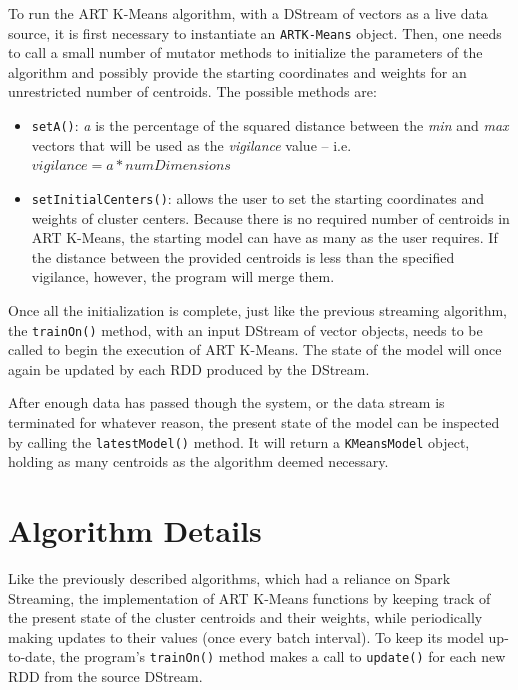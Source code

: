 \documentclass{l4proj}
\begin{document}
To run the ART K-Means algorithm, with a DStream of vectors as a live data source, it is first necessary to instantiate an \texttt{ARTK-Means} object. Then, one needs to call a small number of mutator methods to initialize the parameters of the algorithm and possibly provide the starting coordinates and weights for an unrestricted number of centroids. The possible methods are:

\begin{itemize}
\item \texttt{setA()}: \textit{a} is the percentage of the squared distance between the \textit{min} and \textit{max} vectors that will be used as the \textit{vigilance} value -- i.e. $vigilance = a * numDimensions$
\item \texttt{setInitialCenters()}: allows the user to set the starting coordinates and weights of cluster centers. Because there is no required number of centroids in ART K-Means, the starting model can have as many as the user requires. If the distance between the provided centroids is less than the specified vigilance, however, the program will merge them.
\end{itemize}

Once all the initialization is complete, just like the previous streaming algorithm, the \texttt{trainOn()} method, with an input DStream of vector objects, needs to be called to begin the execution of ART K-Means. The state of the model will once again be updated by each RDD produced by the DStream.

After enough data has passed though the system, or the data stream is terminated for whatever reason, the present state of the model can be inspected by calling the \texttt{latestModel()} method. It will return a \texttt{KMeansModel} object, holding as many centroids as the algorithm deemed necessary.

\section{Algorithm Details}

Like the previously described algorithms, which had a reliance on Spark Streaming, the implementation of ART K-Means functions by keeping track of the present state of the cluster centroids and their weights, while periodically making updates to their values (once every batch interval). To keep its model up-to-date, the program's \texttt{trainOn()} method makes a call to \texttt{update()} for each new RDD from the source DStream. 
\end{document}
